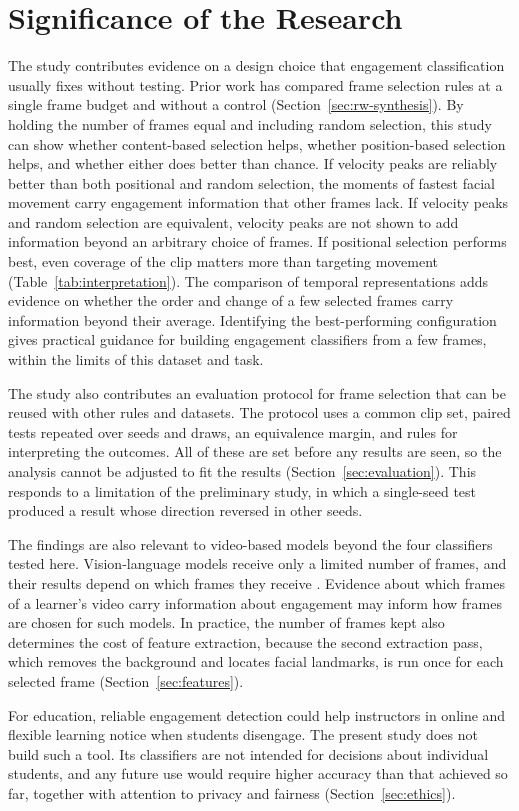 
\section{Significance of the Research}
\label{sec:significance}

The study contributes evidence on a design choice that engagement classification usually fixes without testing. Prior work has compared frame selection rules at a single frame budget and without a control (Section~\ref{sec:rw-synthesis}). By holding the number of frames equal and including random selection, this study can show whether content-based selection helps, whether position-based selection helps, and whether either does better than chance. If velocity peaks are reliably better than both positional and random selection, the moments of fastest facial movement carry engagement information that other frames lack. If velocity peaks and random selection are equivalent, velocity peaks are not shown to add information beyond an arbitrary choice of frames. If positional selection performs best, even coverage of the clip matters more than targeting movement (Table~\ref{tab:interpretation}). The comparison of temporal representations adds evidence on whether the order and change of a few selected frames carry information beyond their average. Identifying the best-performing configuration gives practical guidance for building engagement classifiers from a few frames, within the limits of this dataset and task.

The study also contributes an evaluation protocol for frame selection that can be reused with other rules and datasets. The protocol uses a common clip set, paired tests repeated over seeds and draws, an equivalence margin, and rules for interpreting the outcomes. All of these are set before any results are seen, so the analysis cannot be adjusted to fit the results (Section~\ref{sec:evaluation}). This responds to a limitation of the preliminary study, in which a single-seed test produced a result whose direction reversed in other seeds.

The findings are also relevant to video-based models beyond the four classifiers tested here. Vision-language models receive only a limited number of frames, and their results depend on which frames they receive \cite{brkic2025,tang2025aks}. Evidence about which frames of a learner's video carry information about engagement may inform how frames are chosen for such models. In practice, the number of frames kept also determines the cost of feature extraction, because the second extraction pass, which removes the background and locates facial landmarks, is run once for each selected frame (Section~\ref{sec:features}).

For education, reliable engagement detection could help instructors in online and flexible learning notice when students disengage. The present study does not build such a tool. Its classifiers are not intended for decisions about individual students, and any future use would require higher accuracy than that achieved so far, together with attention to privacy and fairness (Section~\ref{sec:ethics}).
